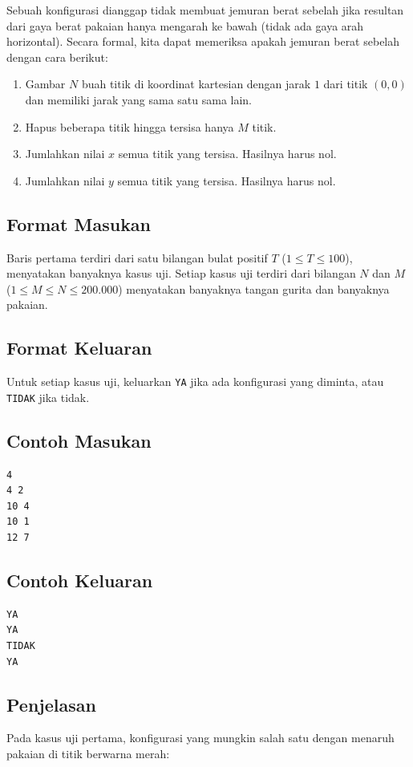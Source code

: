 \documentclass{article}
\begin{document}
Sebuah konfigurasi dianggap tidak membuat jemuran berat sebelah jika resultan dari gaya berat pakaian hanya mengarah ke bawah (tidak ada gaya arah horizontal).
Secara formal, kita dapat memeriksa apakah jemuran berat sebelah dengan cara berikut:
\begin{enumerate}
    \item Gambar $N$ buah titik di koordinat kartesian dengan jarak $1$ dari titik $(0,0)$ dan memiliki jarak yang sama satu sama lain.
    \item Hapus beberapa titik hingga tersisa hanya $M$ titik.
    \item Jumlahkan nilai $x$ semua titik yang tersisa. Hasilnya harus nol.
    \item Jumlahkan nilai $y$ semua titik yang tersisa. Hasilnya harus nol.
\end{enumerate}

\subsection*{Format Masukan}
Baris pertama terdiri dari satu bilangan bulat positif $T$ ($1 \leq T \leq 100$), menyatakan banyaknya kasus uji.
Setiap kasus uji terdiri dari bilangan $N$ dan $M$ ($1 \leq M \leq N \leq 200.000$) menyatakan banyaknya tangan gurita dan banyaknya pakaian.

\subsection*{Format Keluaran}
Untuk setiap kasus uji, keluarkan \lstinline{YA} jika ada konfigurasi yang diminta, atau \lstinline{TIDAK} jika tidak.

\begin{multicols}{2}
\subsection*{Contoh Masukan}
\begin{lstlisting}
4
4 2
10 4
10 1
12 7
\end{lstlisting}
\columnbreak
\subsection*{Contoh Keluaran}
\begin{lstlisting}
YA
YA
TIDAK
YA
\end{lstlisting}
\vfill
\null
\end{multicols}

\subsection*{Penjelasan}
Pada kasus uji pertama, konfigurasi yang mungkin salah satu dengan menaruh pakaian di titik berwarna merah:
\end{document}
